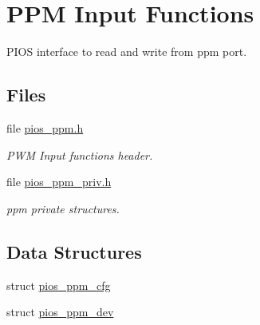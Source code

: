 \hypertarget{group___p_i_o_s___p_p_m}{\section{P\-P\-M Input Functions}
\label{group___p_i_o_s___p_p_m}
}


P\-I\-O\-S interface to read and write from ppm port.  


\subsection*{Files}
\begin{DoxyCompactItemize}
\item 
file \hyperlink{pios__ppm_8h}{pios\-\_\-ppm.\-h}
\begin{DoxyCompactList}\small\item\em P\-W\-M Input functions header. \end{DoxyCompactList}\item 
file \hyperlink{pios__ppm__priv_8h}{pios\-\_\-ppm\-\_\-priv.\-h}
\begin{DoxyCompactList}\small\item\em ppm private structures. \end{DoxyCompactList}\end{DoxyCompactItemize}
\subsection*{Data Structures}
\begin{DoxyCompactItemize}
\item 
struct \hyperlink{structpios__ppm__cfg}{pios\-\_\-ppm\-\_\-cfg}
\item 
struct \hyperlink{structpios__ppm__dev}{pios\-\_\-ppm\-\_\-dev}
\end{DoxyCompactItemize}
